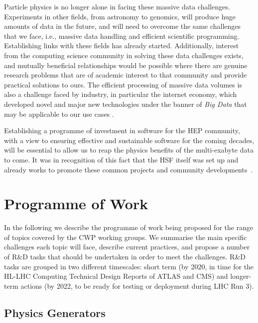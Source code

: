 Particle physics is no longer alone in facing these massive data
challenges. Experiments in other fields, from astronomy to genomics,
will produce huge amounts of data in the future, and will need to
overcome the same challenges that we face, i.e., massive data handling and
efficient scientific programming. Establishing links with these fields
has already started. Additionally, interest from the computing science
community in solving these data challenges exists, and mutually
beneficial relationships would be possible where there are genuine
research problems that are of academic interest to that community and
provide practical solutions to ours. The efficient processing of massive
data volumes is also a challenge faced by industry, in particular the
internet economy, which developed novel and major new technologies under
the banner of \emph{Big Data} that may be applicable to our use cases
\cite{47224,Shanahan:2015:LSD:2783258.2789993,Armbrust:2015:SSR:2723372.2742797}.

Establishing a programme of investment in software for the HEP
community, with a view to ensuring effective and sustainable software
for the coming decades, will be essential to allow us to reap the
physics benefits of the multi-exabyte data to come. It was in recognition of
this fact that the HSF itself was set up and already works to promote
these common projects and community developments~\cite{HSF2015}.

\hypertarget{programme-of-work}{%
\section{Programme of Work}\label{programme-of-work}}

In the following we describe the programme of work being proposed for
the range of topics covered by the CWP working groups. We summarise the
main specific challenges each topic will face, describe current
practices, and propose a number of R\&D tasks that should be undertaken
in order to meet the challenges. R\&D tasks are grouped in two different
timescales: short term (by 2020, in time for the HL-LHC Computing Technical Design Reports of
ATLAS and CMS) and longer-term actions (by 2022, to be ready for testing
or deployment during LHC Run 3).


\hypertarget{physics-generators}{%
\subsection{Physics Generators}\label{physics-generators}}

